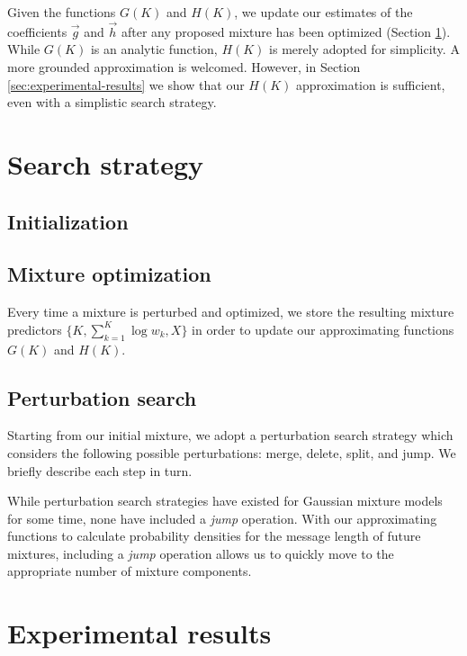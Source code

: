 \documentclass{article}
\def\weight{w}
\begin{document}
Given the functions $G(K)$ and $H(K)$, we update our estimates of the 
coefficients $\vec{g}$ and $\vec{h}$ after any proposed mixture has been
optimized (Section \ref{sec:search-strategy}).  While $G(K)$ is an analytic
function, $H(K)$ is merely adopted for simplicity.  A more grounded
approximation is welcomed.  However, in Section \ref{sec:experimental-results}
we show that our $H(K)$ approximation is sufficient, even with a simplistic
search strategy. 



\section{Search strategy}
\label{sec:search-strategy}

\subsection{Initialization}


\subsection{Mixture optimization}


Every time a mixture is perturbed and optimized, we store the
resulting mixture predictors $\{K, \sum_{k=1}^{K}\log\weight_k, X\}$ in order
to update our approximating functions $G(K)$ and $H(K)$.


\subsection{Perturbation search}

Starting from our initial mixture, we adopt a perturbation search strategy 
which considers the following possible perturbations: merge, delete, split,
and jump.  We briefly describe each step in turn.  



While perturbation search strategies have existed for Gaussian
mixture models for some time, none have included a \emph{jump} operation.
With our approximating functions to calculate probability densities for the
message length of future mixtures, including a \emph{jump} operation allows
us to quickly move to the appropriate number of mixture components.





\section{Experimental results}
\end{document}
